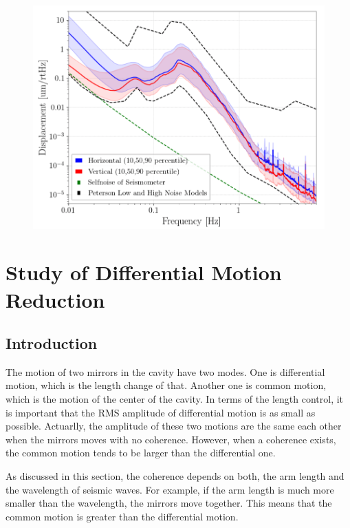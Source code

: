 \begin{figure}[p]
  \begin{center}   
    \includegraphics[width=13.0cm]{./img_chap3/img313.png}
    \caption{}\label{img:img313}
  \end{center}
\end{figure}


\section{Study of Differential Motion Reduction}\label{sec:34}
\subsection{Introduction}
The motion of two mirrors in the cavity have two modes. One is differential motion, which is the length change of that. Another one is common motion, which is the motion of the center of the cavity. In terms of the length control, it is important that the RMS amplitude of differential motion is as small as possible. Actuarlly, the amplitude of these two motions are the same each other when the mirrors moves with no coherence. However, when a coherence exists, the common motion tends to be larger than the differential one. 

As discussed in this section, the coherence depends on both, the arm length and the wavelength of seismic waves. For example, if the arm length is much more smaller than the wavelength, the mirrors move together. This means that the common motion is greater than the differential motion.

